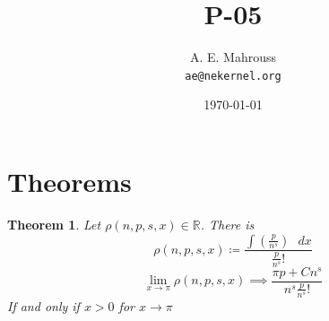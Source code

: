 \documentclass[11pt, a4paper]{article}
\title{P-05}
\author{A. E. Mahrouss\\\texttt{ae@nekernel.org}}
\date{\today}
\theoremstyle{plain}
\newtheorem{theorem}{Theorem}[section]
\theoremstyle{definition}
\theoremstyle{remark}
\begin{document}
\twocolumn[{%
  \maketitle
  \vspace{-0.5em}
  \vspace{0.8em}
  \rule{\linewidth}{0.4pt}
  \vspace{1em}
}]

\maketitle

\section{Theorems}
\begin{theorem}
Let $\rho(n, p, s, x) \in \mathbb{R}$. There is
\begin{equation}
\rho(n, p, s, x) \coloneq \frac{\int (\frac{p}{n^{s}}) \text{ } dx}{\frac{p}{n^{s}}! }
\end{equation}
\begin{equation}
  \lim_{x \to \pi} \rho(n, p, s, x) \implies \frac{\pi p+Cn^s}{n^s\frac{p}{n^s}!}
\end{equation}
If and only if $x > 0$ for $x \to \pi$
\end{theorem}
\end{document}

